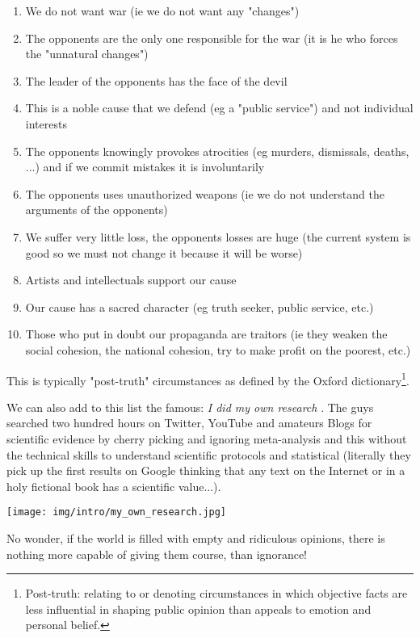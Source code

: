 	\begin{enumerate}
		\item We do not want war (ie we do not want any "changes")
		
		\item The opponents are the only one responsible for the war (it is he who forces the "unnatural changes")
		
		\item The leader of the opponents has the face of the devil
		
		\item This is a noble cause that we defend (eg a "public service") and not individual interests
		
		\item The opponents knowingly provokes atrocities (eg murders, dismissals, deaths, ...) and if we commit mistakes it is involuntarily
		
		\item The opponents uses unauthorized weapons (ie we do not understand the arguments of the opponents)
		
		\item We suffer very little loss, the opponents losses are huge (the current system is good so we must not change it because it will be worse)
		
		\item Artists and intellectuals support our cause
		
		\item Our cause has a sacred character (eg truth seeker, public service, etc.)
		
		\item Those who put in doubt our propaganda are traitors (ie they weaken the social cohesion, the national cohesion, try to make profit on the poorest, etc.)
	\end{enumerate}
	This is typically "post-truth" circumstances as defined by the Oxford dictionary\footnote{Post-truth: relating to or denoting circumstances in which objective facts are less influential in shaping public opinion than appeals to emotion and personal belief.}.
	
	We can also add to this list the famous: \og \textit{I did my own research} \fg{}. The guys searched two hundred hours on Twitter, YouTube and amateurs Blogs for scientific evidence by cherry picking and ignoring meta-analysis and this without the technical skills to understand scientific protocols and statistical (literally they pick up the first results on Google thinking that any text on the Internet or in a holy fictional book has a scientific value...).
	\begin{center}
		\texttt{[image: img/intro/my\_own\_research.jpg]}
	\end{center}
	No wonder, if the world is filled with empty and ridiculous opinions, there is nothing more capable of giving them course, than ignorance!
	
